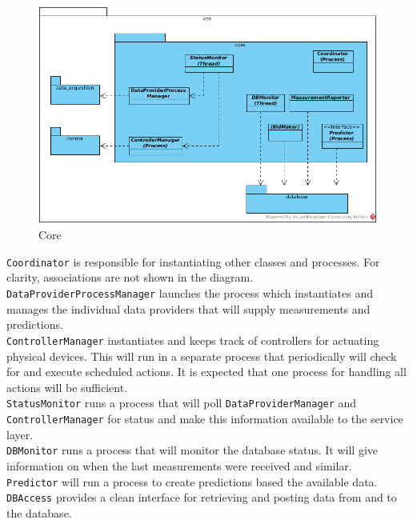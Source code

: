 \begin{figure}[H]
    \centering
    \includegraphics[width=\textwidth]{figures/class_core}
    \caption{Core}
    \label{figureClassDiagram}
\end{figure}

\texttt{Coordinator} is responsible for instantiating other classes and processes. For clarity, associations are not shown in the diagram.\\

\texttt{DataProviderProcessManager} launches the process which instantiates and manages the individual data providers that will supply measurements and predictions. \\

\texttt{ControllerManager} instantiates and keeps track of controllers for actuating physical devices. This will run in a separate process that periodically will check for and execute scheduled actions. It is expected that one process for handling all actions will be sufficient. \\

\texttt{StatusMonitor} runs a process that will poll \texttt{DataProviderManager} and \texttt{ControllerManager} for status and make this information available to the service layer.\\

\texttt{DBMonitor} runs a process that will monitor the database status. It will give information on when the last measurements were received and similar.\\

\texttt{Predictor} will run a process to create predictions based the available data.\\

\texttt{DBAccess} provides a clean interface for retrieving and posting data from and to the database. 


